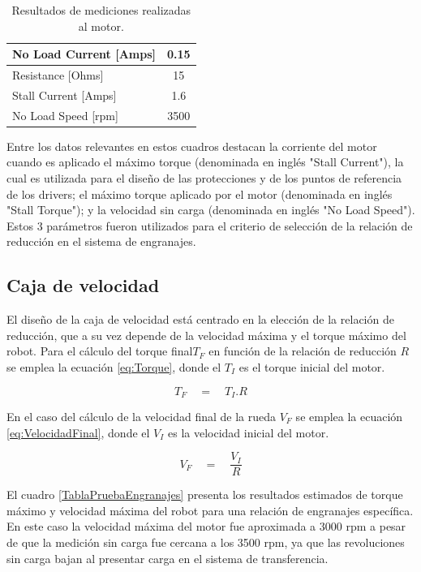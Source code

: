 \begin{table}[htbp]
	\caption{Resultados de mediciones realizadas al motor.}
	\centering
	\begin{tabular}{|l|c|}
		\hline
		No Load Current [Amps] & 0.15 \\ \hline
		Resistance [Ohms] & 15 \\ \hline
		Stall Current [Amps] & 1.6 \\ \hline
		No Load Speed [rpm] & 3500 \\ \hline
	\end{tabular}
	\label{MabuchiResultados}
\end{table}


Entre los datos relevantes en estos cuadros destacan la corriente del motor cuando es aplicado el máximo torque (denominada en inglés "Stall Current"), la cual es utilizada para el diseño de las protecciones y de los puntos de referencia de los drivers; el máximo torque aplicado por el motor (denominada en inglés "Stall Torque");  y  la velocidad sin carga (denominada en inglés "No Load Speed"). Estos 3 parámetros fueron  utilizados para el criterio de selección de la relación de reducción en el sistema de engranajes.

\subsection{Caja de velocidad}


El diseño de la caja de velocidad está centrado en la elección de la relación de reducción, que a su vez depende de la velocidad máxima y el torque máximo del robot. Para el cálculo del torque final${ T }_{ F }$ en función de la relación de reducción $R$ se emplea la ecuación \ref{eq:Torque}, donde el ${ T }_{ I }$ es el torque inicial del motor.


\begin{equation}
\label{eq:Torque}
{ T }_{ F }\quad =\quad { T }_{ I }.R
\end{equation}


En el caso del cálculo de la velocidad final de la rueda ${ V }_{ F }$ se emplea la ecuación \ref{eq:VelocidadFinal}, donde el ${ V }_{ I }$ es la velocidad inicial del motor.

\begin{equation}
\label{eq:VelocidadFinal}
{ V }_{ F }\quad =\quad \frac { { V }_{ I } }{ R } 
\end{equation}


El cuadro \ref{TablaPruebaEngranajes} presenta los resultados estimados  de torque máximo y velocidad máxima del robot para una relación de engranajes específica. En este caso la velocidad máxima del motor fue aproximada a 3000 rpm a pesar de que la medición sin carga fue cercana a los 3500 rpm, ya que las revoluciones sin carga bajan al presentar carga en el sistema de transferencia.


